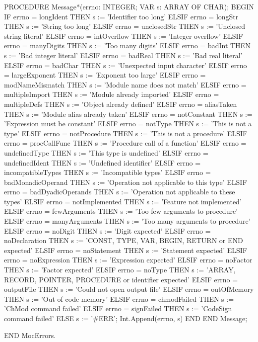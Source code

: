 \documentclass[utf8]{lgu}
\begin{document}
\begin{modula2long}
PROCEDURE Message*(errno: INTEGER; VAR s: ARRAY OF CHAR);
BEGIN
  IF     errno = longIdent         THEN s := 'Identifier too long'
  ELSIF errno = longStr           THEN s := 'String too long'
  ELSIF errno = unclosedStr       THEN s := 'Unclosed string literal'
  ELSIF errno = intOverflow       THEN s := 'Integer overflow'
  ELSIF errno = manyDigits        THEN s := 'Too many digits'
  ELSIF errno = badInt             THEN s := 'Bad integer literal'
  ELSIF errno = badReal           THEN s := 'Bad real literal'
  ELSIF errno = badChar           THEN s := 'Unexpected input character'
  ELSIF errno = largeExponent     THEN s := 'Exponent too large'
  ELSIF errno = modNameMismatch THEN s := 'Module name does not match'
  ELSIF errno = multipleImport     THEN s := 'Module already imported'
  ELSIF errno = multipleDefs      THEN s := 'Object already defined'
  ELSIF errno = aliasTaken        THEN s := 'Module alias already taken'
  ELSIF errno = notConstant       THEN s := 'Expression must be constant'
  ELSIF errno = notType           THEN s := 'This is not a type'
  ELSIF errno = notProcedure      THEN s := 'This is not a procedure'
  ELSIF errno = procCallFunc       THEN s := 'Procedure call of a function'
  ELSIF errno = undefinedType     THEN s := 'This type is undefined'
  ELSIF errno = undefinedIdent     THEN s := 'Undefined identifier'
  ELSIF errno = incompatibleTypes  THEN s := 'Incompatible types'
  ELSIF errno = badMonadicOperand THEN
    s := 'Operation not applicable to this type'
  ELSIF errno = badDyadicOperands THEN
    s := 'Operation not applicable to these types'
  ELSIF errno = notImplemented    THEN s := 'Feature not implemented'
  ELSIF errno = fewArguments     THEN s := 'Too few arguments to procedure'
  ELSIF errno = manyArguments    THEN s := 'Too many arguments to procedure'
  ELSIF errno = noDigit             THEN s := 'Digit expected'
  ELSIF errno = noDeclaration      THEN
    s := 'CONST, TYPE, VAR, BEGIN, RETURN or END expected'
  ELSIF errno = noStatement   THEN s := 'Statement expected'
  ELSIF errno = noExpression  THEN s := 'Expression expected'
  ELSIF errno = noFactor      THEN s := 'Factor expected'
  ELSIF errno = noType        THEN
    s := 'ARRAY, RECORD, POINTER, PROCEDURE or identifier expected'
  ELSIF errno = outputFile     THEN s := 'Could not open output file'
  ELSIF errno = outOfMemory  THEN s := 'Out of code memory'
  ELSIF errno = chmodFailed   THEN s := 'ChMod command failed'
  ELSIF errno = signFailed     THEN s := 'CodeSign command failed'
  ELSE
    s := '#ERR'; Int.Append(errno, s)
  END
END Message;

END MocErrors.
\end{modula2long}
\end{document}
